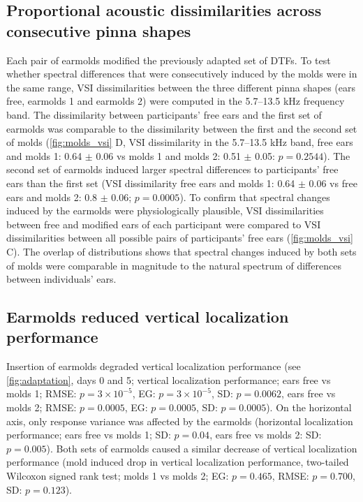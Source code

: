 \subsection{Proportional acoustic dissimilarities across consecutive pinna shapes}

Each pair of earmolds modified the previously adapted set of DTFs. To test whether spectral differences that were consecutively induced by the molds were in the same range, VSI dissimilarities between the three different pinna shapes (ears free, earmolds 1 and earmolds 2) were computed in the 5.7–13.5 kHz frequency band. The dissimilarity between participants' free ears and the first set of earmolds was comparable to the dissimilarity between the first and the second set of molds (\cref{fig:molds_vsi} D, VSI dissimilarity in the 5.7–13.5 kHz band, free ears and molds 1:  0.64 $\pm$ 0.06 vs molds 1 and molds 2:  0.51 $\pm$ 0.05: $p = 0.2544$). The second set of earmolds induced larger spectral differences to participants' free ears than the first set (VSI dissimilarity free ears and molds 1:  0.64 $\pm$ 0.06 vs free ears and molds 2: 0.8 $\pm$ 0.06; $p = 0.0005$). To confirm that spectral changes induced by the earmolds were physiologically plausible, VSI dissimilarities between free and modified ears of each participant were compared to VSI dissimilarities between all possible pairs of participants’ free ears (\cref{fig:molds_vsi} C). The overlap of distributions shows that spectral changes induced by both sets of molds were comparable in magnitude to the natural spectrum of differences between individuals’ ears.

\subsection{Earmolds reduced vertical localization performance}

Insertion of earmolds degraded vertical localization performance (see \cref{fig:adaptation}, days 0 and 5; vertical localization performance; ears free vs molds 1; RMSE: $p = 3  \times 10^{-5}$, EG: $p = 3 \times 10^{-5}$, SD: $p = 0.0062$, ears free vs molds 2; RMSE: $p = 0.0005$, EG: $p = 0.0005$, SD: $p = 0.0005$). On the horizontal axis, only response variance was affected by the earmolds (horizontal localization performance; ears free vs molds 1; SD: $p = 0.04$, ears free vs molds 2: SD: $p = 0.005$). Both sets of earmolds caused a similar decrease of vertical localization performance (mold induced drop in vertical localization performance, two-tailed Wilcoxon signed rank test; molds 1 vs molds 2; EG: $p = 0.465$, RMSE: $p = 0.700$, SD: $p = 0.123$).

